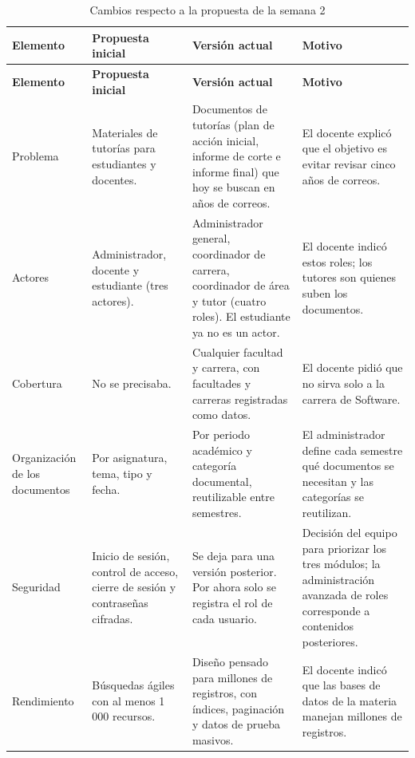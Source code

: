 \documentclass[12pt,a4paper,oneside]{article}
\begin{document}
\begingroup\small
\begin{longtable}{>{\raggedright\arraybackslash}p{2.3cm}>{\raggedright\arraybackslash}p{3.6cm}>{\raggedright\arraybackslash}p{4.3cm}>{\raggedright\arraybackslash}p{3.9cm}}
\caption{Cambios respecto a la propuesta de la semana 2}\label{tab:cambios}\\
\toprule
\textbf{Elemento} & \textbf{Propuesta inicial} & \textbf{Versión actual} & \textbf{Motivo} \\
\midrule
\endfirsthead
\toprule
\textbf{Elemento} & \textbf{Propuesta inicial} & \textbf{Versión actual} & \textbf{Motivo} \\
\midrule
\endhead
Problema &
Materiales de tutorías para estudiantes y docentes. &
Documentos de tutorías (plan de acción inicial, informe de corte e informe final)
que hoy se buscan en años de correos. &
El docente explicó que el objetivo es evitar revisar cinco años de correos. \\
\addlinespace
Actores &
Administrador, docente y estudiante (tres actores). &
Administrador general, coordinador de carrera, coordinador de área y tutor (cuatro
roles). El estudiante ya no es un actor. &
El docente indicó estos roles; los tutores son quienes suben los documentos. \\
\addlinespace
Cobertura &
No se precisaba. &
Cualquier facultad y carrera, con facultades y carreras registradas como datos. &
El docente pidió que no sirva solo a la carrera de Software. \\
\addlinespace
Organización de los documentos &
Por asignatura, tema, tipo y fecha. &
Por periodo académico y categoría documental, reutilizable entre semestres. &
El administrador define cada semestre qué documentos se necesitan y las categorías
se reutilizan. \\
\addlinespace
Seguridad &
Inicio de sesión, control de acceso, cierre de sesión y contraseñas cifradas. &
Se deja para una versión posterior. Por ahora solo se registra el rol de cada usuario. &
Decisión del equipo para priorizar los tres módulos; la administración avanzada de
roles corresponde a contenidos posteriores. \\
\addlinespace
Rendimiento &
Búsquedas ágiles con al menos 1\,000 recursos. &
Diseño pensado para millones de registros, con índices, paginación y datos de prueba
masivos. &
El docente indicó que las bases de datos de la materia manejan millones de registros. \\
\bottomrule
\end{longtable}
\endgroup
\end{document}
